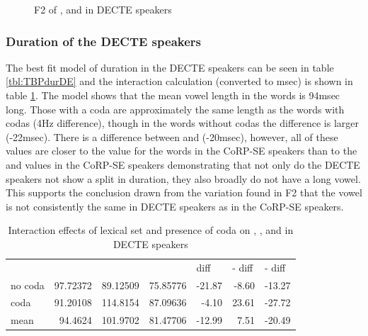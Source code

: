 \documentclass[../../../00.FullDoc/tex/ThesisSkeleton-draft2]{subfiles}
\begin{document}


\begin{figure}[h]
	
	\caption{F2 of \trap{}, \bath{} and \palm{}  in DECTE speakers} \label{fig:TBF2DE}
\end{figure}


\subsubsection{Duration of the DECTE speakers}

The best fit model of duration in the DECTE speakers can be seen in table \ref{tbl:TBPdurDE} and the interaction calculation (converted to msec) is shown in table \ref{tbl:TBPdurDE-inter}. The model shows that the mean vowel length in the \bath{} words is 94msec long. Those with a coda are approximately the same length as the \trap{} words with codas (4Hz difference), though in the words without codas the difference is larger (-22msec). There is a difference between \trap{} and \palm{} (-20msec), however, all of these values are closer to the value for the \trap{} words in the CoRP-SE speakers than to the \palm{} and \bath{} values in the CoRP-SE speakers demonstrating that not only do the DECTE speakers not show a \TB{} split in duration, they also broadly do not have a long \palm{} vowel. This supports the conclusion drawn from the variation found in F2 that the \palm{} vowel is not consistently the same in DECTE speakers as in the CoRP-SE speakers.


\begin{table}[htbp]
	\centering

	\begin{tabular}{lrrrrrr}
		& \multicolumn{1}{l}{\bath{}} & \multicolumn{1}{l}{\palm{}} & \multicolumn{1}{l}{\trap{}} & \multicolumn{1}{l}{\TB{} diff} & \multicolumn{1}{l}{\palm{}-\bath{} diff} & \multicolumn{1}{l}{\trap{}-\palm{} diff} \\
		no coda & 97.72372 & 89.12509 & 75.85776 & -21.87 & -8.60 & -13.27 \\
		coda & 91.20108 & 114.8154 & 87.09636 & -4.10 & 23.61 & -27.72 \\
		mean  & 94.4624 & 101.9702 & 81.47706 & -12.99 & 7.51  & -20.49 \\
	\end{tabular}%
		\caption{Interaction effects of lexical set and presence of coda on \trap{}, \bath{}, and \palm{} in DECTE speakers} \label{tbl:TBPdurDE-inter}%
\end{table}%
\end{document}
